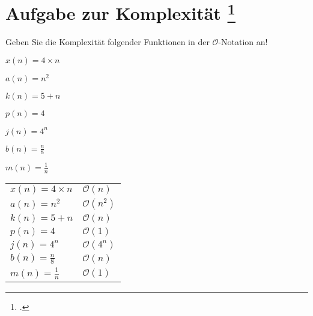 \documentclass{lehramt-informatik-aufgabe}
\begin{document}
\section{Aufgabe zur Komplexität
\footcite[Seite 1-2]{aud:pu:2}}

\noindent
Geben Sie die Komplexität folgender Funktionen in der
$\mathcal{O}$-Notation an!

\begin{compactitem}
\item $x(n) = 4 \times n$
\item $a(n) = n^2$
\item $k(n) = 5 + n$
\item $p(n) = 4$
\item $j(n) = 4^n$
\item $b(n) = \frac{n}{8}$
\item $m(n) = \frac{1}{n}$
\end{compactitem}

\begin{antwort}
\begin{tabular}{ll}
$x(n) = 4 \times n$  & $\mathcal{O}(n)$\\
$a(n) = n^2$         & $\mathcal{O}(n^2)$ \\
$k(n) = 5 + n$       & $\mathcal{O}(n)$ \\
$p(n) = 4$           & $\mathcal{O}(1)$ \\
$j(n) = 4^n$         & $\mathcal{O}(4^n)$ \\
$b(n) = \frac{n}{8}$ & $\mathcal{O}(n)$\\
$m(n) = \frac{1}{n}$ & $\mathcal{O}(1)$\\
\end{tabular}
\end{antwort}
\end{document}

